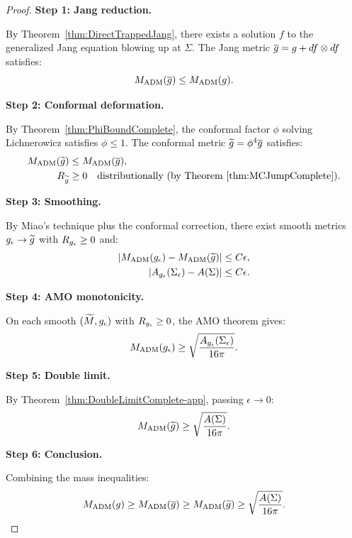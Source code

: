 \begin{proof}
\textbf{Step 1: Jang reduction.}

By Theorem~\ref{thm:DirectTrappedJang}, there exists a solution $f$ to the generalized Jang equation blowing up at $\Sigma$. The Jang metric $\overline{g} = g + df \otimes df$ satisfies:
\begin{equation}
    M_{\mathrm{ADM}}(\overline{g}) \le M_{\mathrm{ADM}}(g).
\end{equation}

\textbf{Step 2: Conformal deformation.}

By Theorem~\ref{thm:PhiBoundComplete}, the conformal factor $\phi$ solving Lichnerowicz satisfies $\phi \le 1$. The conformal metric $\widetilde{g} = \phi^4 \overline{g}$ satisfies:
\begin{align}
    M_{\mathrm{ADM}}(\widetilde{g}) &\le M_{\mathrm{ADM}}(\overline{g}), \\
    R_{\widetilde{g}} &\ge 0 \quad \text{distributionally (by Theorem~\ref{thm:MCJumpComplete})}.
\end{align}

\textbf{Step 3: Smoothing.}

By Miao's technique plus the conformal correction, there exist smooth metrics $g_{\epsilon} \to \widetilde{g}$ with $R_{g_{\epsilon}} \ge 0$ and:
\begin{align}
    |M_{\mathrm{ADM}}(g_{\epsilon}) - M_{\mathrm{ADM}}(\widetilde{g})| &\le C\epsilon, \\
    |A_{g_{\epsilon}}(\Sigma_\epsilon) - A(\Sigma)| &\le C\epsilon.
\end{align}

\textbf{Step 4: AMO monotonicity.}

On each smooth $(\widetilde{M}, g_{\epsilon})$ with $R_{g_{\epsilon}} \ge 0$, the AMO theorem gives:
\begin{equation}
    M_{\mathrm{ADM}}(g_{\epsilon}) \ge \sqrt{\frac{A_{g_{\epsilon}}(\Sigma_\epsilon)}{16\pi}}.
\end{equation}

\textbf{Step 5: Double limit.}

By Theorem~\ref{thm:DoubleLimitComplete-app}, passing $\epsilon \to 0$:
\begin{equation}
    M_{\mathrm{ADM}}(\widetilde{g}) \ge \sqrt{\frac{A(\Sigma)}{16\pi}}.
\end{equation}

\textbf{Step 6: Conclusion.}

Combining the mass inequalities:
\begin{equation}
    M_{\mathrm{ADM}}(g) \ge M_{\mathrm{ADM}}(\overline{g}) \ge M_{\mathrm{ADM}}(\widetilde{g}) \ge \sqrt{\frac{A(\Sigma)}{16\pi}}.
\end{equation}
\end{proof}

